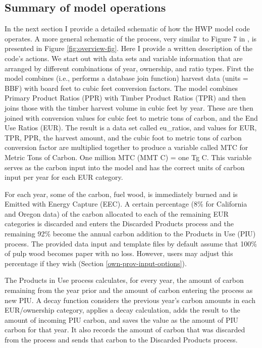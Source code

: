 \documentclass[
  openany]{book}
\begin{document}
\hypertarget{model-func-opp}{%
\subsection{Summary of model operations}\label{model-func-opp}}

In the next section I provide a detailed schematic of how the HWP model code operates. A more general schematic of the process, very similar to Figure 7 in \textcite{stockmann2012}, is presented in Figure \ref{fig:overview-fig}. Here I provide a written description of the code's actions. We start out with data sets and variable information that are arranged by different combinations of year, ownership, and ratio types. First the model combines (i.e., performs a database join function) harvest data (units = BBF) with board feet to cubic feet conversion factors. The model combines Primary Product Ratios (PPR) with Timber Product Ratios (TPR) and then joins those with the timber harvest volume in cubic feet by year. These are then joined with conversion values for cubic feet to metric tons of carbon, and the End Use Ratios (EUR). The result is a data set called eu\_ratios, and values for EUR, TPR, PPR, the harvest amount, and the cubic foot to metric tons of carbon conversion factor are multiplied together to produce a variable called MTC for Metric Tons of Carbon. One million MTC (MMT C) = one Tg C. This variable serves as the carbon input into the model and has the correct units of carbon input per year for each EUR category.

For each year, some of the carbon, fuel wood, is immediately burned and is Emitted with Energy Capture (EEC). A certain percentage (8\% for California and Oregon data) of the carbon allocated to each of the remaining EUR categories is discarded and enters the Discarded Products process and the remaining 92\% become the annual carbon addition to the Products in Use (PIU) process. The provided data input and template files by default assume that 100\% of pulp wood becomes paper with no loss. However, users may adjust this percentage if they wish (Section \ref{own-prov-input-options}).

The Products in Use process calculates, for every year, the amount of carbon remaining from the year prior and the amount of carbon entering the process as new PIU. A decay function considers the previous year's carbon amounts in each EUR/ownership category, applies a decay calculation, adds the result to the amount of incoming PIU carbon, and saves the value as the amount of PIU carbon for that year. It also records the amount of carbon that was discarded from the process and sends that carbon to the Discarded Products process.
\end{document}
